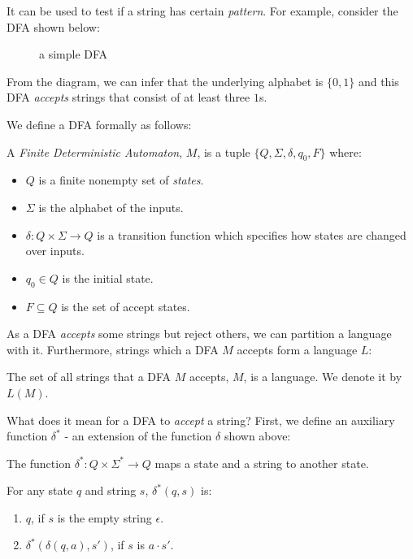 \documentclass[11pt]{article}
\begin{document}
It can be used to test if a string has certain \emph{pattern}. For example, consider the DFA shown below:
\begin{figure}[ht]
    \centering
    \caption{a simple DFA}
    \label{fig:fig1}
\end{figure}

From the diagram, we can infer that the underlying alphabet is $\{0, 1\}$ and this DFA \emph{accepts} strings
that consist of at least three $1$s.

We define a DFA formally as follows:
\begin{definition}
A \emph{Finite Deterministic Automaton}, $M$, is a tuple $\{Q, \Sigma, \delta, q_0, F\}$ where:
\begin{itemize}
\item $Q$ is a finite nonempty set of \emph{states}.
\item $\Sigma$ is the alphabet of the inputs.
\item $\delta: Q \times \Sigma \rightarrow Q$ is a transition function which specifies how states are changed over
inputs.
\item $q_0 \in Q$ is the initial state.
\item $F \subseteq Q$ is the set of accept states.
\end{itemize}
\end{definition}

As a DFA \emph{accepts} some strings but reject others, we can partition a language with it. Furthermore,
strings which a DFA $M$ accepts form a language $L$:
\begin{definition}
The set of all strings that a DFA $M$ accepts, $M$, is a language. We denote it by $L(M)$.
\end{definition}

What does it mean for a DFA to \emph{accept} a string? First, we define an auxiliary function $\delta ^ \ast$ - an
extension of the function $\delta$ shown above:
\begin{definition}
The function $\delta ^ \ast : Q \times \Sigma ^ \ast \rightarrow Q$ maps a state and a string to another state.

For any state $q$ and string $s$, $\delta ^ \ast (q, s)$ is:
\begin{enumerate}
\item $q$, if $s$ is the empty string $\epsilon$.
\item $\delta ^ \ast( \delta(q, a), s' )$, if $s$ is $a \cdot s'$.
\end{enumerate}
\end{definition}
\end{document}
